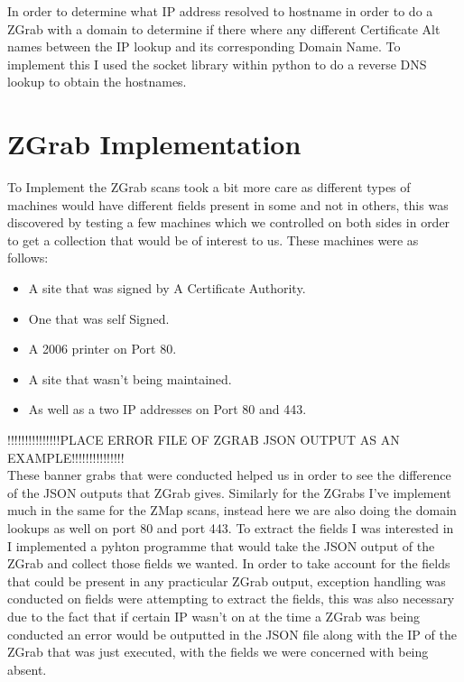 \documentclass[a4wide,leqno,12pt]{report}
\begin{document}
In order to determine what IP address resolved to hostname in order to do a ZGrab with a domain to determine if there where any different Certificate Alt names between the IP lookup and its corresponding Domain Name. To implement this I used the socket library within python to do a reverse DNS lookup to obtain the hostnames.\\


\section{ZGrab Implementation}

To Implement the ZGrab scans took a bit more care as different types of machines would have different fields present in some and not in others, this was discovered by testing a few machines which we controlled on both sides in order to get a collection that would be of interest to us. These machines were as follows:

\begin{itemize}
  \item A site that was signed by A Certificate Authority.
  \item One that was self Signed.
  \item A 2006 printer on Port 80.
  \item A site that wasn't being maintained.
  \item As well as a two IP addresses on Port 80 and 443.
 
\end{itemize}


!!!!!!!!!!!!!!!PLACE ERROR FILE OF ZGRAB JSON OUTPUT AS AN EXAMPLE!!!!!!!!!!!!!!!\\

These banner grabs that were conducted helped us in order to see the difference of the JSON outputs that ZGrab gives. Similarly for the ZGrabs I've implement much in the same for the ZMap scans, instead here we are also doing the domain lookups as well on port 80 and port 443. To extract the fields I was interested in I implemented a pyhton programme that would take the JSON output of the ZGrab and collect those fields we wanted. In order to take account for the fields that could be present in any practicular ZGrab output, exception handling was conducted on fields were attempting to extract the fields, this was also necessary due to the fact that if certain IP wasn't on at the time a ZGrab was being conducted an error would be outputted in the JSON file along with the IP of the ZGrab that was just executed, with the fields we were concerned with being absent.
\end{document}
